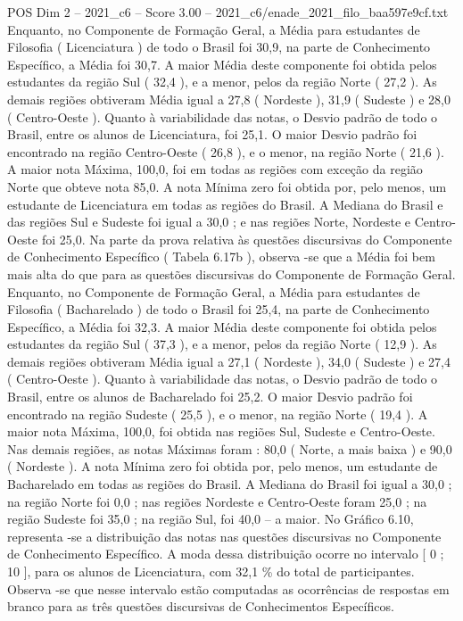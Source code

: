 \begin{textsample}{POS Dim 2 – 2021\_c6 – Score 3.00 – 2021\_c6/enade\_2021\_filo\_baa597e9cf.txt}
Enquanto, no Componente de Formação Geral, a Média para estudantes de Filosofia ( Licenciatura ) de todo o Brasil foi 30,9, na parte de Conhecimento Específico, a Média foi 30,7.
A maior Média deste componente foi obtida pelos estudantes da região Sul ( 32,4 ), e a menor, pelos da região Norte ( 27,2 ).
As demais regiões obtiveram Média igual a 27,8 ( Nordeste ), 31,9 ( Sudeste ) e 28,0 ( Centro-Oeste ).
Quanto à variabilidade das notas, o Desvio padrão de todo o Brasil, entre os alunos de Licenciatura, foi 25,1.
O maior Desvio padrão foi encontrado na região Centro-Oeste ( 26,8 ), e o menor, na região Norte ( 21,6 ).
A maior nota Máxima, 100,0, foi em todas as regiões com exceção da região Norte que obteve nota 85,0.
A nota Mínima zero foi obtida por, pelo menos, um estudante de Licenciatura em todas as regiões do Brasil.
A Mediana do Brasil e das regiões Sul e Sudeste foi igual a 30,0 ; e nas regiões Norte, Nordeste e Centro-Oeste foi 25,0.
Na parte da prova relativa às questões discursivas do Componente de Conhecimento Específico ( Tabela 6.17b ), observa -se que a Média foi bem mais alta do que para as questões discursivas do Componente de Formação Geral.
Enquanto, no Componente de Formação Geral, a Média para estudantes de Filosofia ( Bacharelado ) de todo o Brasil foi 25,4, na parte de Conhecimento Específico, a Média foi 32,3.
A maior Média deste componente foi obtida pelos estudantes da região Sul ( 37,3 ), e a menor, pelos da região Norte ( 12,9 ).
As demais regiões obtiveram Média igual a 27,1 ( Nordeste ), 34,0 ( Sudeste ) e 27,4 ( Centro-Oeste ).
Quanto à variabilidade das notas, o Desvio padrão de todo o Brasil, entre os alunos de Bacharelado foi 25,2.
O maior Desvio padrão foi encontrado na região Sudeste ( 25,5 ), e o menor, na região Norte ( 19,4 ).
A maior nota Máxima, 100,0, foi obtida nas regiões Sul, Sudeste e Centro-Oeste.
Nas demais regiões, as notas Máximas foram : 80,0 ( Norte, a mais baixa ) e 90,0 ( Nordeste ).
A nota Mínima zero foi obtida por, pelo menos, um estudante de Bacharelado em todas as regiões do Brasil.
A Mediana do Brasil foi igual a 30,0 ; na região Norte foi 0,0 ; nas regiões Nordeste e Centro-Oeste foram 25,0 ; na região Sudeste foi 35,0 ; na região Sul, foi 40,0 – a maior.
No Gráfico 6.10, representa -se a distribuição das notas nas questões discursivas no Componente de Conhecimento Específico.
A moda dessa distribuição ocorre no intervalo [ 0 ; 10 ], para os alunos de Licenciatura, com 32,1 \% do total de participantes.
Observa -se que nesse intervalo estão computadas as ocorrências de respostas em branco para as três questões discursivas de Conhecimentos Específicos.

\end{textsample}
